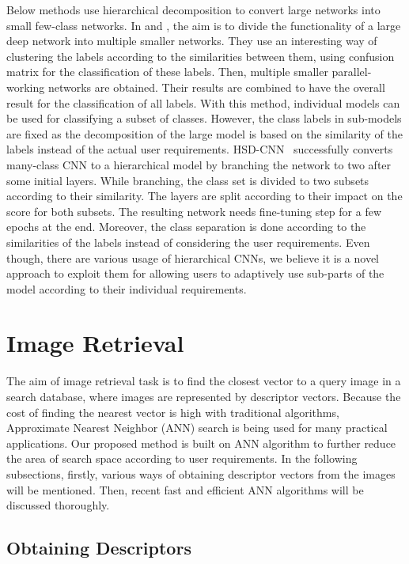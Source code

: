 Below methods use hierarchical decomposition to convert large networks into small few-class networks.
In \cite{chennupati2016hierarchical} and \cite{nooka2016adaptive}, the aim is to divide the functionality of a large deep network into multiple smaller networks. 
They use an interesting way of clustering the labels according to the similarities between them, using confusion matrix for the classification of these labels.
Then, multiple smaller parallel-working networks are obtained. 
Their results are combined to have the overall result for the classification of all labels.
With this method, individual models can be used for classifying a subset of classes.
However, the class labels in sub-models are fixed as the decomposition of the large model is based on the similarity of the labels instead of the actual user requirements.
HSD-CNN~\cite{sairam2018hsd} successfully converts many-class CNN to a hierarchical model by branching the network to two after some initial layers.
While branching, the class set is divided to two subsets according to their similarity.
The layers are split according to their impact on the score for both subsets.
The resulting network needs fine-tuning step for a few epochs at the end. 
Moreover, the class separation is done according to the similarities of the labels instead of considering the user requirements.
Even though, there are various usage of hierarchical CNNs, we believe it is a novel approach to exploit them for allowing users to adaptively use sub-parts of the model according to their individual requirements.


\section{Image Retrieval}

The aim of image retrieval task is to find the closest vector to a query image in a search database, where images are represented by descriptor vectors.
Because the cost of finding the nearest vector is high with traditional algorithms, Approximate Nearest Neighbor (ANN) search is being used for many practical applications.
Our proposed method is built on ANN algorithm to further reduce the area of search space according to user requirements. 
In the following subsections, firstly, various ways of obtaining descriptor vectors from the images will be mentioned. 
Then, recent fast and efficient ANN algorithms will be discussed thoroughly. 

\subsection{Obtaining Descriptors}

